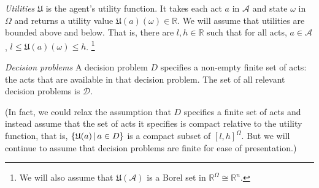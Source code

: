 \documentclass[a4paper]{article}
\newcommand\A{\mathcal{A}}
\renewcommand\P{\mathbb{P}} %
\newcommand\EU{\mathrm{EU}}
\newcommand\REU{\mathrm{REU}}
\newcommand\EAd{\mathrm{EAd}}
\newcommand\U{\mathfrak{U}} %
\newcommand\Maximin{\Gamma}
\newcommand{\D}{\mathcal{D}}
\renewcommand\S{\mathcal{S}}
\renewcommand\c{\mathsf{c}} %
\newcommand{\IP}{\P}
\renewcommand{\Re}{\mathbb{R}}
\newcommand{\todoold}[2][]{\todo[backgroundcolor=white,bordercolor=orange!10,linecolor=gray!10, #1,caption={},textcolor=gray]{Pre-rev: #2}}
\newcommand\SetDelimiter[1][]{
	\nonscript\,#1\vert \allowbreak \nonscript\,\mathopen{}}
\providecommand\given{\SetDelimiter}
\renewcommand{\emptyset}{\varnothing}
\renewcommand{\leq}{\leqslant}
\newenvironment{CCM rewritten}
{\begingroup\color{blue}} %
{\endgroup}              %
\begin{document}
 \emph{Utilities } $\U$ is the agent's utility function. It takes each act $a$ in $\A$ and state $\omega$ in $\Omega$ and returns a utility value $\U(a)(\omega)\in\Re$. We will assume that utilities are bounded above and below. That is, there are $l,h\in\Re$ such that for all acts, $a\in\A$, $l\leq \U(a)(\omega)\leq h$.%
 \footnote{We will also assume that $\U(\A)$ is a Borel set in $\Re^\Omega\cong\Re^n$.}

\emph{Decision problems } A decision problem $D$ specifies a non-empty finite set of acts: the acts that are available in that decision problem. The set of all relevant decision problems is $\D$. %

(In fact, we could relax the assumption that $D$ specifies a finite set of acts and instead assume that the set of acts it specifies is compact relative to the utility function, that is, $\{\U(a)\given a \in D\}$ is a compact subset of $[l,h]^\Omega$. But we will continue to assume that decision problems are finite for ease of presentation.)


\end{document}
